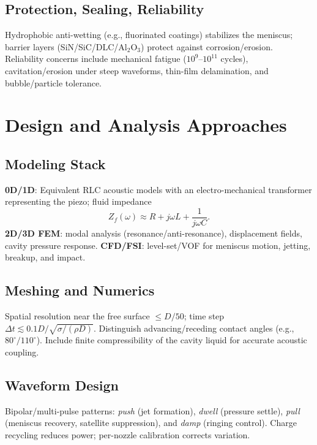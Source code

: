 \documentclass[conference]{IEEEtran}
\begin{document}
\subsection{Protection, Sealing, Reliability}
Hydrophobic anti-wetting (e.g., fluorinated coatings) stabilizes the meniscus; barrier layers (SiN/SiC/DLC/Al$_2$O$_3$) protect against corrosion/erosion. Reliability concerns include mechanical fatigue ($10^9$–$10^{11}$ cycles), cavitation/erosion under steep waveforms, thin-film delamination, and bubble/particle tolerance.

\section{Design and Analysis Approaches}
\subsection{Modeling Stack}
\textbf{0D/1D}: Equivalent RLC acoustic models with an electro-mechanical transformer representing the piezo; fluid impedance
\begin{equation}
Z_f(\omega)\approx R + j\omega L + \frac{1}{j\omega C}.
\end{equation}
\textbf{2D/3D FEM}: modal analysis (resonance/anti-resonance), displacement fields, cavity pressure response. 
\textbf{CFD/FSI}: level-set/VOF for meniscus motion, jetting, breakup, and impact.

\subsection{Meshing and Numerics}
Spatial resolution near the free surface $\le D/50$; time step $\Delta t \lesssim 0.1D/\sqrt{\sigma/(\rho D)}$. Distinguish advancing/receding contact angles (e.g., $80^\circ/110^\circ$). Include finite compressibility of the cavity liquid for accurate acoustic coupling.

\subsection{Waveform Design}
Bipolar/multi-pulse patterns: \emph{push} (jet formation), \emph{dwell} (pressure settle), \emph{pull} (meniscus recovery, satellite suppression), and \emph{damp} (ringing control). Charge recycling reduces power; per-nozzle calibration corrects variation.

\end{document}

